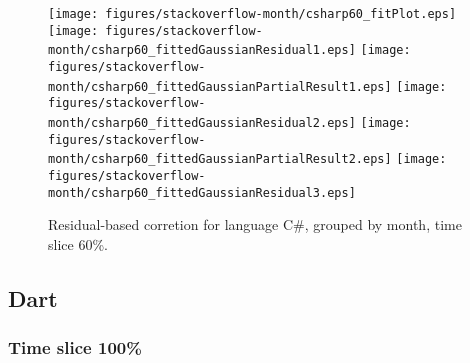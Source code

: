 \begin{figure}[t]
\centering
{}
{\texttt{[image: figures/stackoverflow-month/csharp60\_fitPlot.eps]}}
{\texttt{[image: figures/stackoverflow-month/csharp60\_fittedGaussianResidual1.eps]}}
{\texttt{[image: figures/stackoverflow-month/csharp60\_fittedGaussianPartialResult1.eps]}}
{\texttt{[image: figures/stackoverflow-month/csharp60\_fittedGaussianResidual2.eps]}}
{\texttt{[image: figures/stackoverflow-month/csharp60\_fittedGaussianPartialResult2.eps]}}
{\texttt{[image: figures/stackoverflow-month/csharp60\_fittedGaussianResidual3.eps]}}
\caption{Residual-based corretion for language C\#, grouped by month, time slice 60\%.}
\end{figure}


\FloatBarrier


\subsection{Dart}

\subsubsection{Time slice 100\%}

